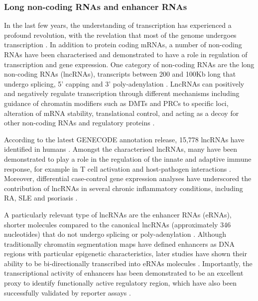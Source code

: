 \subsubsection{Long non-coding RNAs and enhancer RNAs}
In the last few years, the understanding of transcription has experienced a profound revolution, with the revelation that most of the genome undergoes transcription \parencite{ENCODE2007}. In addition to protein coding mRNAs, a number of non-coding RNAs have been characterised and demonstrated to have a role in regulation of transcription and gene expression. One category of non-coding RNAs are the long non-coding RNAs (lncRNAs), transcripts between 200 and 100Kb long that undergo splicing, 5' capping and 3' poly-adenylation \parencite{Derrien2012}. LncRNAs can positively and negatively regulate transcription through different mechanisms including guidance of chromatin modifiers such as DMTs and PRCs to specific loci, alteration of mRNA stability, translational control, and acting as a decoy for other non-coding RNAs and regulatory proteins \parencite{Pandei2008,Faghihi2008,Gong2011,Carrieri2012, Kino2010}.  %

According to the latest GENECODE annotation release, 15,778 lncRNAs have identified in humans \parencite{Derrien2012}. Amongst the characterised lncRNAs, many have been demonstrated to play a role in the regulation of the innate and adaptive immune response, for example in T cell activation and host-pathogen interactions \parencite{Pang2009, Rossetto2009}. Moreover, differential case-control gene expression analyses have underscored the contribution of lncRNAs in several chronic inflammatory conditions, including RA, SLE and psoriasis \parencite{Muller2014,Shi2014,Li2014,Ahn2016}.

A particularly relevant type of lncRNAs are the enhancer RNAs (eRNAs), shorter molecules compared to the canonical lncRNAs (approximately 346 nucleotides) that do not undergo splicing or poly-adenylation \parencite{FANTOM2014}. Although traditionally chromatin segmentation maps have defined enhancers as DNA regions with particular epigenetic characteristics, later studies have shown their ability to be bi-directionally transcribed into eRNAs molecules \parencite{De Santa2010, Kim2010}. Importantly, the transcriptional activity of enhancers has been demonstrated to be an excellent proxy to identify functionally active regulatory region, which have also been successfully validated by reporter assays \parencite{FANTOM2014, Anderssen2014}. 




